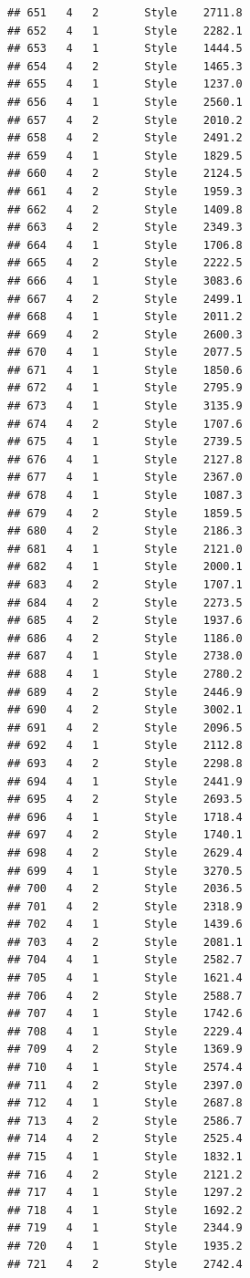 \documentclass[12pt,]{krantz}
\theoremstyle{definition}
\theoremstyle{definition}
\theoremstyle{remark}
\begin{document}
\begin{verbatim}
## 651   4   2       Style    2711.8
## 652   4   1       Style    2282.1
## 653   4   1       Style    1444.5
## 654   4   2       Style    1465.3
## 655   4   1       Style    1237.0
## 656   4   1       Style    2560.1
## 657   4   2       Style    2010.2
## 658   4   2       Style    2491.2
## 659   4   1       Style    1829.5
## 660   4   2       Style    2124.5
## 661   4   2       Style    1959.3
## 662   4   2       Style    1409.8
## 663   4   2       Style    2349.3
## 664   4   1       Style    1706.8
## 665   4   2       Style    2222.5
## 666   4   1       Style    3083.6
## 667   4   2       Style    2499.1
## 668   4   1       Style    2011.2
## 669   4   2       Style    2600.3
## 670   4   1       Style    2077.5
## 671   4   1       Style    1850.6
## 672   4   1       Style    2795.9
## 673   4   1       Style    3135.9
## 674   4   2       Style    1707.6
## 675   4   1       Style    2739.5
## 676   4   1       Style    2127.8
## 677   4   1       Style    2367.0
## 678   4   1       Style    1087.3
## 679   4   2       Style    1859.5
## 680   4   2       Style    2186.3
## 681   4   1       Style    2121.0
## 682   4   1       Style    2000.1
## 683   4   2       Style    1707.1
## 684   4   2       Style    2273.5
## 685   4   2       Style    1937.6
## 686   4   2       Style    1186.0
## 687   4   1       Style    2738.0
## 688   4   1       Style    2780.2
## 689   4   2       Style    2446.9
## 690   4   2       Style    3002.1
## 691   4   2       Style    2096.5
## 692   4   1       Style    2112.8
## 693   4   2       Style    2298.8
## 694   4   1       Style    2441.9
## 695   4   2       Style    2693.5
## 696   4   1       Style    1718.4
## 697   4   2       Style    1740.1
## 698   4   2       Style    2629.4
## 699   4   1       Style    3270.5
## 700   4   2       Style    2036.5
## 701   4   2       Style    2318.9
## 702   4   1       Style    1439.6
## 703   4   2       Style    2081.1
## 704   4   1       Style    2582.7
## 705   4   1       Style    1621.4
## 706   4   2       Style    2588.7
## 707   4   1       Style    1742.6
## 708   4   1       Style    2229.4
## 709   4   2       Style    1369.9
## 710   4   1       Style    2574.4
## 711   4   2       Style    2397.0
## 712   4   1       Style    2687.8
## 713   4   2       Style    2586.7
## 714   4   2       Style    2525.4
## 715   4   1       Style    1832.1
## 716   4   2       Style    2121.2
## 717   4   1       Style    1297.2
## 718   4   1       Style    1692.2
## 719   4   1       Style    2344.9
## 720   4   1       Style    1935.2
## 721   4   2       Style    2742.4

\end{verbatim}
\end{document}
